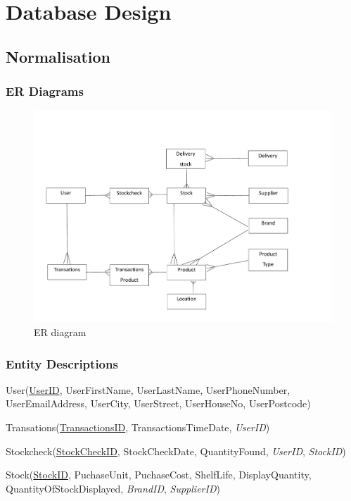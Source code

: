 \section{Database Design}

\subsection{Normalisation}

\subsubsection{ER Diagrams}

\begin{figure}[H]
    \includegraphics[width=\textwidth]{./Design/pdfimages/ER_diagram.pdf}
    \caption{ER diagram} \label{fig:ER diagram}
\end{figure}

\subsubsection{Entity Descriptions}

User(\underline{UserID}, UserFirstName, UserLastName, UserPhoneNumber, UserEmailAddress, UserCity, UserStreet, UserHouseNo, UserPostcode)

Transations(\underline{TransactionsID}, TransactionsTimeDate, \emph{UserID})

Stockcheck(\underline{StockCheckID}, StockCheckDate, QuantityFound, \emph{UserID}, \emph{StockID})

Stock(\underline{StockID}, PuchaseUnit, PuchaseCost, ShelfLife, DisplayQuantity, QuantityOfStockDisplayed, \emph{BrandID}, \emph{SupplierID})

